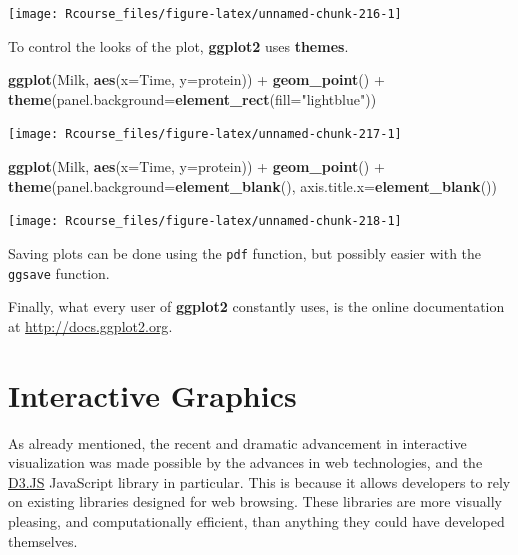 \documentclass[]{book}
\newenvironment{Shaded}{\begin{snugshade}}{\end{snugshade}}
\newcommand{\KeywordTok}[1]{\textcolor[rgb]{0.13,0.29,0.53}{\textbf{{#1}}}}
\newcommand{\DataTypeTok}[1]{\textcolor[rgb]{0.13,0.29,0.53}{{#1}}}
\newcommand{\StringTok}[1]{\textcolor[rgb]{0.31,0.60,0.02}{{#1}}}
\newcommand{\NormalTok}[1]{{#1}}
\theoremstyle{definition}
\theoremstyle{definition}
\theoremstyle{remark}
\begin{document}
\texttt{[image: Rcourse\_files/figure-latex/unnamed-chunk-216-1]}

To control the looks of the plot, \textbf{ggplot2} uses \textbf{themes}.

\begin{Shaded}
\begin{Highlighting}[]
\KeywordTok{ggplot}\NormalTok{(Milk, }\KeywordTok{aes}\NormalTok{(}\DataTypeTok{x=}\NormalTok{Time, }\DataTypeTok{y=}\NormalTok{protein)) +}
\StringTok{  }\KeywordTok{geom_point}\NormalTok{() +}
\StringTok{  }\KeywordTok{theme}\NormalTok{(}\DataTypeTok{panel.background=}\KeywordTok{element_rect}\NormalTok{(}\DataTypeTok{fill=}\StringTok{"lightblue"}\NormalTok{))}
\end{Highlighting}
\end{Shaded}

\texttt{[image: Rcourse\_files/figure-latex/unnamed-chunk-217-1]}

\begin{Shaded}
\begin{Highlighting}[]
\KeywordTok{ggplot}\NormalTok{(Milk, }\KeywordTok{aes}\NormalTok{(}\DataTypeTok{x=}\NormalTok{Time, }\DataTypeTok{y=}\NormalTok{protein)) +}
\StringTok{  }\KeywordTok{geom_point}\NormalTok{() +}
\StringTok{  }\KeywordTok{theme}\NormalTok{(}\DataTypeTok{panel.background=}\KeywordTok{element_blank}\NormalTok{(),}
        \DataTypeTok{axis.title.x=}\KeywordTok{element_blank}\NormalTok{())}
\end{Highlighting}
\end{Shaded}

\texttt{[image: Rcourse\_files/figure-latex/unnamed-chunk-218-1]}

Saving plots can be done using the \texttt{pdf} function, but possibly
easier with the \texttt{ggsave} function.

Finally, what every user of \textbf{ggplot2} constantly uses, is the
online documentation at \url{http://docs.ggplot2.org}.

\section{Interactive Graphics}\label{interactive-graphics}

As already mentioned, the recent and dramatic advancement in interactive
visualization was made possible by the advances in web technologies, and
the \href{https://d3js.org/}{D3.JS} JavaScript library in particular.
This is because it allows developers to rely on existing libraries
designed for web browsing. These libraries are more visually pleasing,
and computationally efficient, than anything they could have developed
themselves.
\end{document}
